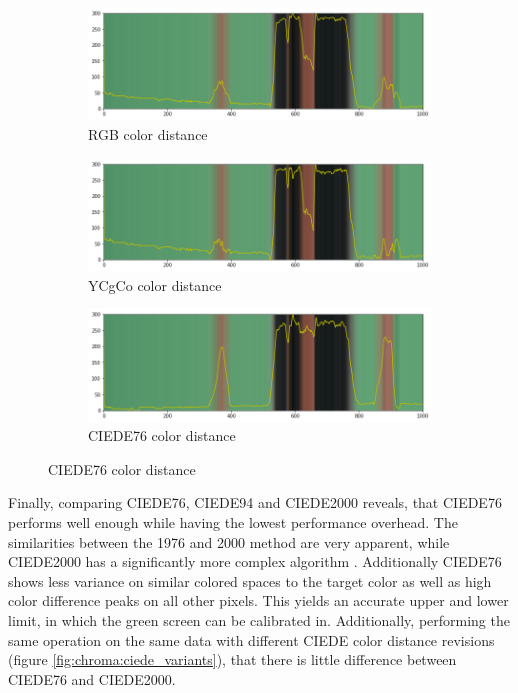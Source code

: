\begin{figure}[htbp]
	\caption{Comparison between different color distance methods}
	\begin{subfigure}[t]{\textwidth}
		\centering
		\includegraphics[width=\textwidth]{gfx/distances/color-rgb.png}
		\caption{RGB color distance} 
	\end{subfigure}
	\begin{subfigure}[t]{\textwidth}
		\centering
		\includegraphics[width=\textwidth]{gfx/distances/color-ycgco.png}
		\caption{YCgCo color distance}
	\end{subfigure}
	\begin{subfigure}[t]{\textwidth}
		\centering
		\includegraphics[width=\textwidth]{gfx/distances/color-ciede76.png}
		\caption{CIEDE76 color distance}
	\end{subfigure}
	\label{fig:chroma:image_comparison}
\end{figure}

Finally, comparing CIEDE76, CIEDE94 and CIEDE2000 reveals, that CIEDE76 
performs well enough while having the lowest performance overhead. The 
similarities between the 1976 and 2000 method are very apparent, while 
CIEDE2000 has a significantly more complex algorithm 
\cite{sharma:ciede2000:2005}.
\newline
Additionally CIEDE76 shows less variance on similar colored spaces to the 
target color as well as high color difference peaks on all other pixels. This 
yields an accurate upper and lower limit, in which the green screen can be 
calibrated in.
\newline
Additionally, performing the same operation on the same data with different 
CIEDE color distance revisions (figure \ref{fig:chroma:ciede_variants}), that 
there is little difference between CIEDE76 and CIEDE2000.

